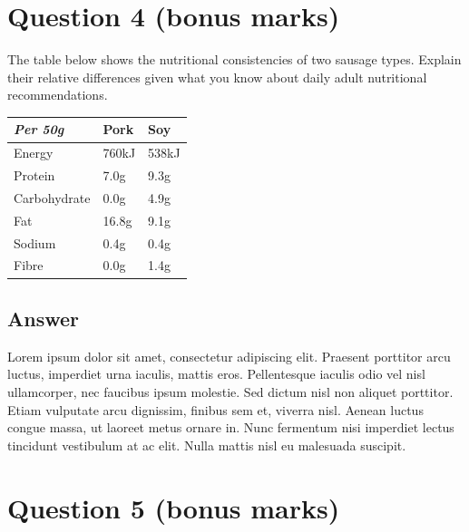 \documentclass[
	12pt, %
]{fphw}
\begin{document}
\section{Question 4 (bonus marks)}

\begin{problem}
	The table below shows the nutritional consistencies of two sausage types. Explain their relative differences given what you know about daily adult nutritional recommendations.
	
	\bigskip
    
	\begin{center}
		\begin{tabular}{l l l}
			\toprule
			\textit{Per 50g} & Pork & Soy \\
			\midrule
			Energy & 760kJ & 538kJ\\
			Protein & 7.0g & 9.3g\\
			Carbohydrate & 0.0g & 4.9g\\
			Fat & 16.8g & 9.1g\\
			Sodium & 0.4g & 0.4g\\
			Fibre & 0.0g & 1.4g\\
			\bottomrule
		\end{tabular}
	\end{center}
	
	\medskip
\end{problem}


\subsection{Answer}

Lorem ipsum dolor sit amet, consectetur adipiscing elit. Praesent porttitor arcu luctus, imperdiet urna iaculis, mattis eros. Pellentesque iaculis odio vel nisl ullamcorper, nec faucibus ipsum molestie. Sed dictum nisl non aliquet porttitor. Etiam vulputate arcu dignissim, finibus sem et, viverra nisl. Aenean luctus congue massa, ut laoreet metus ornare in. Nunc fermentum nisi imperdiet lectus tincidunt vestibulum at ac elit. Nulla mattis nisl eu malesuada suscipit.


\section{Question 5 (bonus marks)}
\end{document}
